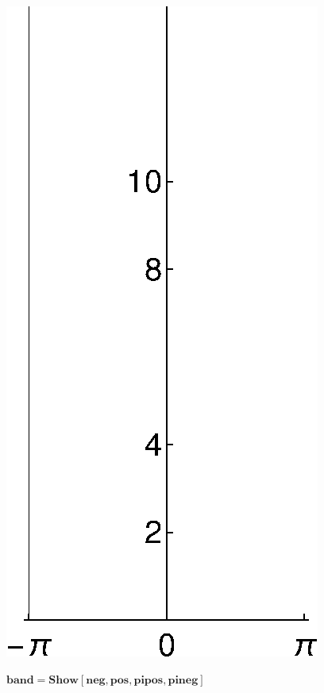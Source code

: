{\includegraphics{chapters/appendices/KP_Mathematica/Kronig_Penney_model_transfer_matrix_gr6.eps}

\begin{doublespace}
\noindent\(\pmb{\text{band}=\text{Show}[\text{neg},\text{pos},\text{pipos},\text{pineg}]}\)
\end{doublespace}

}
